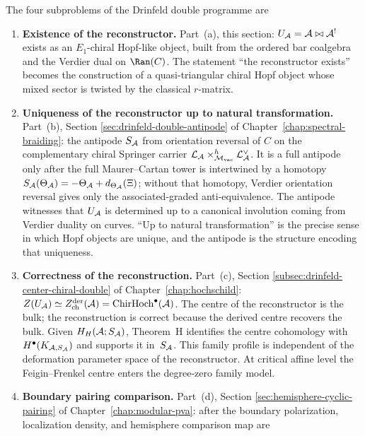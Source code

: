 \begin{remark}
\label{rem:drinfeld-programme-four-conditions}
The four subproblems of the Drinfeld double programme are
\begin{enumerate}[label=\textup{(\alph*)},leftmargin=2em]
\item \textbf{Existence of the reconstructor.}
Part~(a), this section: $U_{\mathcal{A}} = \mathcal{A} \bowtie \mathcal{A}^!$ exists as
an $E_1$-chiral Hopf-like object, built from the ordered bar
coalgebra and the Verdier dual on $\Ran(C)$. The statement
``the reconstructor exists'' becomes the construction of a
quasi-triangular chiral Hopf object whose mixed sector is
twisted by the classical $r$-matrix.
\item \textbf{Uniqueness of the reconstructor up to natural
transformation.} Part~(b), Section
\textup{\ref{sec:drinfeld-double-antipode}} of
Chapter~\textup{\ref{chap:spectral-braiding}}: the antipode
$S_{\mathcal{A}}$ from orientation reversal of $C$ on the complementary
chiral Springer carrier
\(\mathcal{L}_{\mathcal{A}}\times^h_{\mathcal M_{\mathrm{vac}}}\mathcal{L}_{\mathcal{A}}^{\vee}\).
It is a full antipode only after the full Maurer--Cartan tower is
intertwined by a homotopy
\(S_{\mathcal{A}}(\Theta_{\mathcal{A}})=-\Theta_{\mathcal{A}}+d_{\Theta_{\mathcal{A}}}(\Xi)\);
without that homotopy, Verdier orientation reversal gives only the
associated-graded anti-equivalence. The antipode witnesses that
$U_{\mathcal{A}}$ is determined up to a canonical involution coming from
Verdier duality on curves. ``Up to natural transformation'' is the
precise sense in which Hopf objects are unique, and the antipode is
the structure encoding that uniqueness.
\item \textbf{Correctness of the reconstruction.} Part~(c),
Section \textup{\ref{subsec:drinfeld-center-chiral-double}} of
Chapter~\textup{\ref{chap:hochschild}}: $Z(U_{\mathcal{A}})\simeq
Z^{\mathrm{der}}_{\mathrm{ch}}(\mathcal{A}) = \mathrm{ChirHoch}^\bullet(\mathcal{A})$.
The centre of the reconstructor is the bulk; the reconstruction
is correct because the derived centre recovers the bulk.
Given $H_H(\mathcal{A};S_{\mathcal{A}})$, Theorem~H identifies the centre cohomology
with $H^\bullet(K_{\mathcal{A},S_{\mathcal{A}}})$ and supports it in~$S_{\mathcal{A}}$.
This family profile is independent of the deformation parameter
space of the reconstructor.  At critical affine level the
Feigin--Frenkel centre enters the degree-zero family model.
\item \textbf{Boundary pairing comparison.}
Part~(d), Section \textup{\ref{sec:hemisphere-cyclic-pairing}}
of Chapter~\textup{\ref{chap:modular-pva}}: after the boundary
polarization, localization density, and hemisphere comparison map are

\end{enumerate}
\end{remark}
